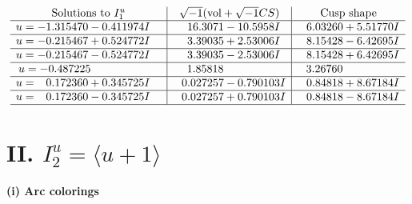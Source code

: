 \documentclass[1p]{elsarticle_modified}
\theoremstyle{definition}
\newcommand{\I}{\sqrt{-1}}
\begin{document}
$$\begin{array}{c|c|c}
\text{Solutions to }I^u_{1}& \I (\text{vol} + \sqrt{-1}CS) & \text{Cusp shape}\\
 \hline 
\begin{aligned}
u &= -1.315470 - 0.411974 I\end{aligned}
 & \phantom{-}16.3071 - 10.5958 I & \phantom{-}6.03260 + 5.51770 I \\ \hline\begin{aligned}
u &= -0.215467 + 0.524772 I\end{aligned}
 & \phantom{-}3.39035 + 2.53006 I & \phantom{-}8.15428 - 6.42695 I \\ \hline\begin{aligned}
u &= -0.215467 - 0.524772 I\end{aligned}
 & \phantom{-}3.39035 - 2.53006 I & \phantom{-}8.15428 + 6.42695 I \\ \hline\begin{aligned}
u &= -0.487225\phantom{ +0.000000I}\end{aligned}
 & \phantom{-}1.85818\phantom{ +0.000000I} & \phantom{-}3.26760\phantom{ +0.000000I} \\ \hline\begin{aligned}
u &= \phantom{-}0.172360 + 0.345725 I\end{aligned}
 & \phantom{-}0.027257 - 0.790103 I & \phantom{-}0.84818 + 8.67184 I \\ \hline\begin{aligned}
u &= \phantom{-}0.172360 - 0.345725 I\end{aligned}
 & \phantom{-}0.027257 + 0.790103 I & \phantom{-}0.84818 - 8.67184 I\\
 \hline 
 \end{array}$$\newpage\newpage\renewcommand{\arraystretch}{1}
\centering \section*{II. $I^u_{2}= \langle u+1 \rangle$}
\flushleft \textbf{(i) Arc colorings}\\
\end{document}
